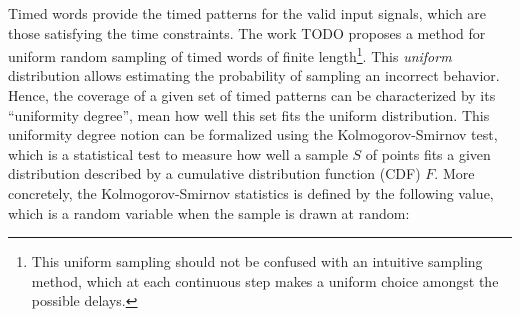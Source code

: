 
Timed words provide the timed patterns for the valid input signals, which are those satisfying the time constraints. The work \cite{BBBK16} {\color{red}TODO} proposes a method for uniform random sampling of timed words of finite length\footnote{This uniform sampling should not be confused with an intuitive sampling method, which at each continuous step makes a uniform choice amongst the possible delays.}. This \emph{uniform} distribution allows estimating the probability of sampling an incorrect behavior. Hence, the coverage of a given set of timed patterns can be characterized by its ``uniformity degree'', mean how well this set fits the uniform distribution. This uniformity degree notion can be formalized using the Kolmogorov-Smirnov test, which is a statistical test to measure how well a sample $S$ of points fits a given distribution described by a cumulative distribution function (CDF) $F$. More concretely, the Kolmogorov-Smirnov statistics is defined by the following value, which is a random variable when the sample is drawn at random:
%
%
%
%
